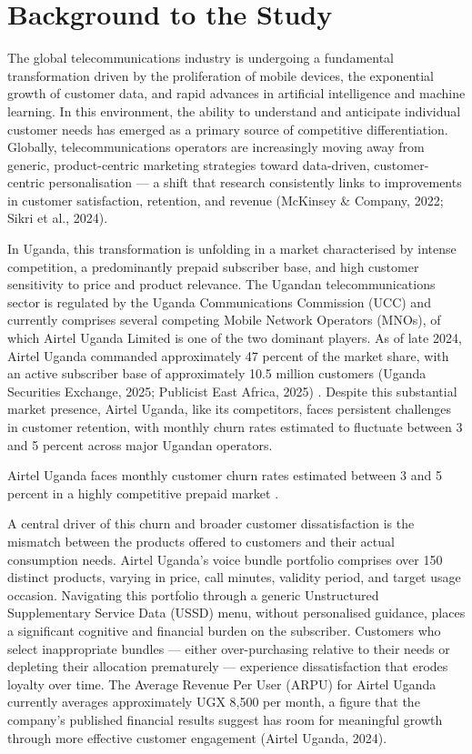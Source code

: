 
\section{Background to the Study}

The global telecommunications industry is undergoing a fundamental transformation driven by the proliferation of mobile devices, the exponential growth of customer data, and rapid advances in artificial intelligence and machine learning. In this environment, the ability to understand and anticipate individual customer needs has emerged as a primary source of competitive differentiation. Globally, telecommunications operators are increasingly moving away from generic, product-centric marketing strategies toward data-driven, customer-centric personalisation --- a shift that research consistently links to improvements in customer satisfaction, retention, and revenue (McKinsey \& Company, 2022; Sikri et al., 2024).

In Uganda, this transformation is unfolding in a market characterised by intense competition, a predominantly prepaid subscriber base, and high customer sensitivity to price and product relevance. The Ugandan telecommunications sector is regulated by the Uganda Communications Commission (UCC) and currently comprises several competing Mobile Network Operators (MNOs), of which Airtel Uganda Limited is one of the two dominant players. As of late 2024, Airtel Uganda commanded approximately 47 percent of the market share, with an active subscriber base of approximately 10.5 million customers (Uganda Securities Exchange, 2025; Publicist East Africa, 2025) \cite{ref3}. Despite this substantial market presence, Airtel Uganda, like its competitors, faces persistent challenges in customer retention, with monthly churn rates estimated to fluctuate between 3 and 5 percent across major Ugandan operators.

Airtel Uganda faces monthly customer churn rates estimated between 3 and 5 percent in a highly competitive prepaid market \cite{ref3}.

A central driver of this churn and broader customer dissatisfaction is the mismatch between the products offered to customers and their actual consumption needs. Airtel Uganda's voice bundle portfolio comprises over 150 distinct products, varying in price, call minutes, validity period, and target usage occasion. Navigating this portfolio through a generic Unstructured Supplementary Service Data (USSD) menu, without personalised guidance, places a significant cognitive and financial burden on the subscriber. Customers who select inappropriate bundles --- either over-purchasing relative to their needs or depleting their allocation prematurely --- experience dissatisfaction that erodes loyalty over time. The Average Revenue Per User (ARPU) for Airtel Uganda currently averages approximately UGX 8,500 per month, a figure that the company's published financial results suggest has room for meaningful growth through more effective customer engagement (Airtel Uganda, 2024).

